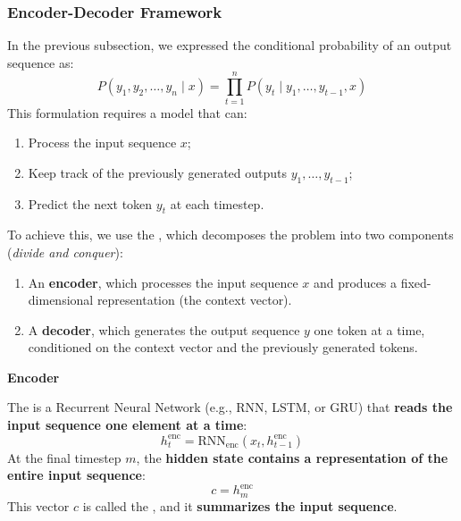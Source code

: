 \subsubsection{Encoder-Decoder Framework}

In the previous subsection, we expressed the conditional probability of an output sequence as:
\begin{equation*}
    P\left(y_1, y_2, \dots, y_n \mid x\right)
    =
    \prod_{t=1}^{n}
    P\left(y_t \mid y_1, \dots, y_{t-1}, x\right)
\end{equation*}
This formulation requires a model that can:
\begin{enumerate}
    \item Process the input sequence $x$;
    \item Keep track of the previously generated outputs $y_1, \dots, y_{t-1}$;
    \item Predict the next token $y_t$ at each timestep.
\end{enumerate}

\highspace
To achieve this, we use the , which decomposes the problem into two components (\emph{divide and conquer}):
\begin{enumerate}
    \item An \textbf{encoder}, which processes the input sequence $x$ and produces a fixed-dimensional representation (the context vector).
    \item A \textbf{decoder}, which generates the output sequence $y$ one token at a time, conditioned on the context vector and the previously generated tokens.
\end{enumerate}

\highspace
\begin{flushleft}
    \textcolor{Green3}{ \textbf{Encoder}}
\end{flushleft}
The  is a Recurrent Neural Network (e.g., RNN, LSTM, or GRU) that \textbf{reads the input sequence one element at a time}:
\begin{equation}\label{eq:encoder}
    h_{t}^{\text{enc}} = \text{RNN}_{\text{enc}}\left(x_t, h_{t-1}^{\text{enc}}\right)
\end{equation}
At the final timestep $m$, the \textbf{hidden state contains a representation of the entire input sequence}:
\begin{equation}\label{eq:context-vector}
    c = h_m^{\text{enc}}
\end{equation}
This vector $c$ is called the , and it \textbf{summarizes the input sequence}.

